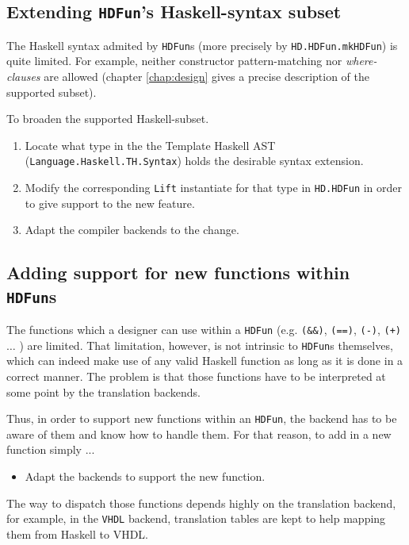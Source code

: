 \subsection{Extending \texttt{HDFun}'s Haskell-syntax subset}
The Haskell syntax admited by \texttt{HDFun}s (more precisely by
\texttt{HD.HDFun.mkHDFun}) is quite limited. For example, neither
constructor pattern-matching nor \textit{where-clauses} are allowed
(chapter \ref{chap:design} gives a precise description of the supported
subset).

To broaden the supported Haskell-subset.

\begin{enumerate}[1)]
\item Locate what type in the the Template Haskell AST
  (\texttt{Language.Haskell.TH.Syntax}) holds the desirable syntax
  extension.
\item Modify the corresponding \texttt{Lift} instantiate for that type in
  \texttt{HD.HDFun}  in order to give support to the new feature.
\item Adapt the compiler backends to the change.
\end{enumerate}
 
\subsection{Adding support for new functions within \texttt{HDFun}s}
The functions which a designer can use within a \texttt{HDFun} (e.g.
\texttt{(\&\&)}, \texttt{(==)}, \texttt{(-)}, \texttt{(+)} $\dots$ )
are limited.  That limitation, however, is not intrinsic to
\texttt{HDFun}s themselves, which can indeed make use of any valid
Haskell function as long as it is done in a correct manner. The
problem is that those functions have to be interpreted at some point
by the translation backends.

Thus, in order to support new functions within an \texttt{HDFun}, the
backend has to be aware of them and know how to handle them.
For that reason, to add in a new function simply ...

\begin{itemize}
\item Adapt the backends to support the new function.
\end{itemize}

The way to dispatch those functions depends highly on the translation
backend, for example, in the \texttt{VHDL} backend, translation tables
are kept to help mapping them from Haskell to VHDL.


